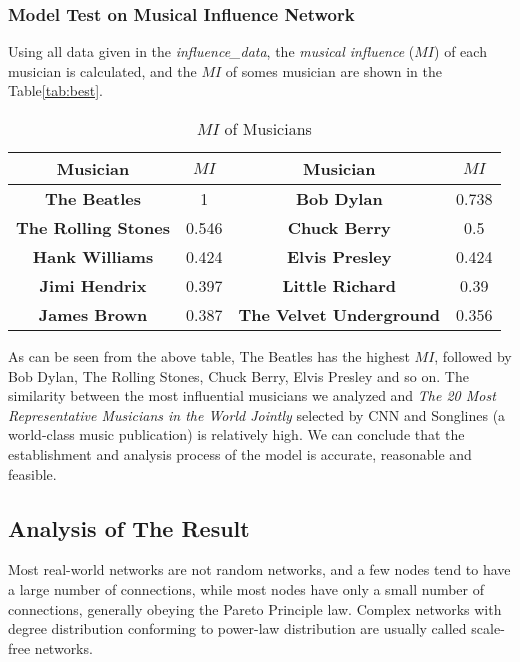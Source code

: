 \documentclass[12pt]{article}  %
\begin{document}
\subsubsection{Model Test on Musical Influence Network}
\vspace{-0.4cm}
Using all data given in the \emph{influence\_data}, the \emph{musical influence} ($MI$) of each musician is calculated, and the $MI$ of somes musician are shown in the Table\eqref{tab:best}.

\vspace{-0.5cm}
\begin{table}[htbp]
	\centering
	\caption{$MI$ of Musicians}
	\begin{tabular}{cc|cc}
		\hline
		\hline
		\textbf{Musician}    & $MI$               & \textbf{Musician}    & $MI$ \\
		\hline
		\hline
		\textbf{The Beatles} & 1                    & \textbf{Bob Dylan}   & 0.738 \\
		\hline
		\textbf{The Rolling Stones} & 0.546                & \textbf{Chuck Berry} & 0.5 \\
		\hline
		\textbf{Hank Williams} & 0.424                & \textbf{Elvis Presley} & 0.424 \\
		\hline
		\textbf{Jimi Hendrix} & 0.397                & \textbf{Little Richard} & 0.39 \\
		\hline
		\textbf{James Brown} & 0.387                & \textbf{The Velvet Underground} & 0.356 \\
		\hline
		\hline
	\end{tabular}%
	\label{tab:best}%
\end{table}%
\vspace{-0.2cm}
As can be seen from the above table, The Beatles has the highest $MI$, followed by Bob Dylan, The Rolling Stones, Chuck Berry, Elvis Presley and so on. The similarity between the most influential musicians we analyzed and \emph{The 20 Most Representative Musicians in the World Jointly} selected by CNN and Songlines\cite{3} (a world-class music publication) is relatively high. We can conclude that the establishment and analysis process of the model is accurate, reasonable and feasible.
\vspace{-0.6cm}
\subsection{Analysis of The Result}
\vspace{-0.3cm}
Most real-world networks are not random networks, and a few nodes tend to have a large number of connections, while most nodes have only a small number of connections, generally obeying the Pareto Principle law\cite{4}. Complex networks with degree distribution conforming to power-law distribution are usually called scale-free networks\cite{5}.
\end{document}
